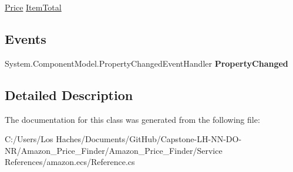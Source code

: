 \begin{DoxyCompactItemize}
\begin{DoxyCompactList}\small\item\em \end{DoxyCompactList}\item 
\hypertarget{class_amazon___price___finder_1_1amazon_1_1ecs_1_1_cart_item_ad7fc64fc649b27085189045c209b3b42}{\hyperlink{class_amazon___price___finder_1_1amazon_1_1ecs_1_1_price}{Price} \hyperlink{class_amazon___price___finder_1_1amazon_1_1ecs_1_1_cart_item_ad7fc64fc649b27085189045c209b3b42}{Item\-Total}}\label{class_amazon___price___finder_1_1amazon_1_1ecs_1_1_cart_item_ad7fc64fc649b27085189045c209b3b42}

\begin{DoxyCompactList}\small\item\em \end{DoxyCompactList}\end{DoxyCompactItemize}
\subsection*{Events}
\begin{DoxyCompactItemize}
\item 
\hypertarget{class_amazon___price___finder_1_1amazon_1_1ecs_1_1_cart_item_a0eeab4ad78984b6c96c0bae6db6d324f}{System.\-Component\-Model.\-Property\-Changed\-Event\-Handler {\bfseries Property\-Changed}}\label{class_amazon___price___finder_1_1amazon_1_1ecs_1_1_cart_item_a0eeab4ad78984b6c96c0bae6db6d324f}

\end{DoxyCompactItemize}


\subsection{Detailed Description}


The documentation for this class was generated from the following file\-:\begin{DoxyCompactItemize}
\item 
C\-:/\-Users/\-Los Haches/\-Documents/\-Git\-Hub/\-Capstone-\/\-L\-H-\/\-N\-N-\/\-D\-O-\/\-N\-R/\-Amazon\-\_\-\-Price\-\_\-\-Finder/\-Amazon\-\_\-\-Price\-\_\-\-Finder/\-Service References/amazon.\-ecs/Reference.\-cs\end{DoxyCompactItemize}
